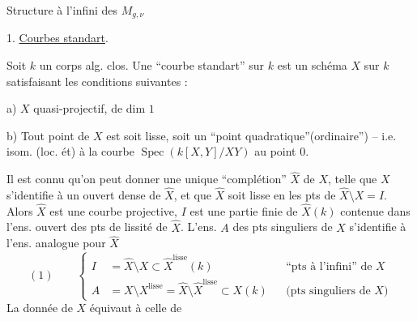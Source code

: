 Structure à l'infini des $M_{g,\nu}$

1. \uline{Courbes standart}.

Soit $k$ un corps alg. clos. Une ``courbe standart'' sur $k$ est un schéma $X$ sur $k$ satisfaisant les conditions suivantes :

a) $X$ quasi-projectif,  de dim $1$

b) Tout point de $X$ est soit lisse, soit un ``point quadratique''(ordinaire'') -- i.e. isom. (loc. ét) à la courbe $\operatorname{Spec}(k[X,Y]/XY)$ au point $0$.

Il est connu qu'on peut donner une unique ``complétion'' $\widehat X$ de $X$, telle que  $X$ s'identifie à un ouvert dense de $\widehat X$, et que $\widehat X$ soit lisse en les pts de $\widehat X\setminus X=I$. Alors $\widehat X$ est une courbe projective, $I$ est  une partie finie de $\widehat X(k)$ contenue dans l'ens. ouvert des pts de lissité de $\widehat X$. L'ens. $A$ des pts singuliers de $X$ s'identifie à l'ens. analogue pour $\widehat X$
\[
(1)\qquad
\left\{\begin{aligned}
I&=\widehat X\setminus X\subset\widehat X^{\mathrm{lisse}}(k)
&&\text{``pts à l'infini'' de }X\\
A&=X\setminus X^{\mathrm{lisse}}=\widehat X\setminus\widehat X^{\mathrm{lisse}}\subset X(k)
&&\text{(pts singuliers de }X\text{)}
\end{aligned}\right.
\]
La donnée de $X$ équivaut à celle de
